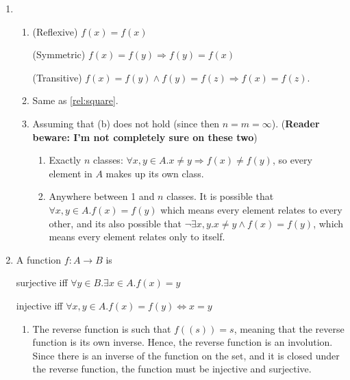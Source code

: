 \documentclass{article}
\begin{document}
\begin{enumerate}
    \item
        \begin{enumerate}
            \item (Reflexive) $f(x) = f(x)$

                (Symmetric) $f(x) = f(y) \Rightarrow f(y) = f(x)$

                (Transitive) $f(x) = f(y) \land f(y) = f(z) \Rightarrow f(x) = f(z)$.
            \item
                Same as \ref{rel:square}.

            \item Assuming that (b) does not hold (since then $n=m=\infty$). (\textbf{Reader beware: I'm not completely sure on these two})

                \begin{enumerate}
                    \item Exactly $n$ classes: $\forall x,y \in A . x \neq y \Rightarrow f(x) \neq f(y)$, so every element in $A$ makes up its own class.
                    \item Anywhere between 1 and $n$ classes. It is possible that $\forall x,y \in A . f(x) = f(y)$ which means every element relates to every other, and its also possible that $\lnot\exists x,y . x \neq y \land f(x) = f(y)$, which means every element relates only to itself.
                \end{enumerate}

        \end{enumerate}

    \item
        A function $f : A \to B$ is

        surjective iff $\forall y \in B . \exists x \in A . f(x) = y$

        injective iff $\forall x,y \in A. f(x) = f(y) \Leftrightarrow x = y$

        \begin{enumerate}
            \item
                The reverse function is such that $f((s)) = s$, meaning that the reverse function is its own inverse. Hence, the reverse function is an involution. Since there is an inverse of the function on the set, and it is closed under the reverse function, the function must be injective and surjective.


\end{enumerate}
\end{enumerate}
\end{document}
